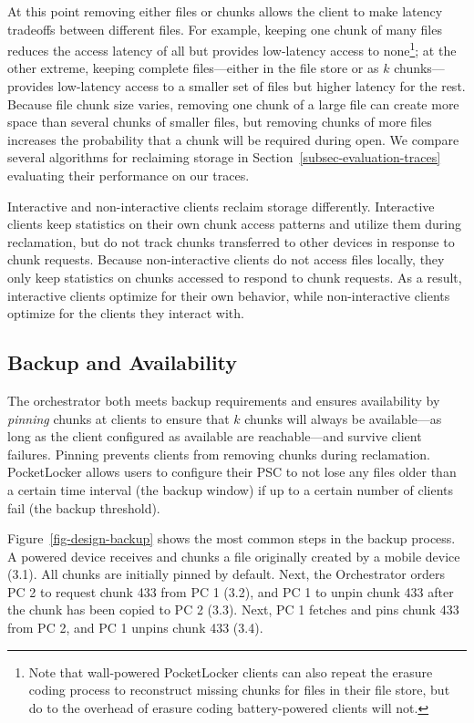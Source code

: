 At this point removing either files or chunks allows the client to make
latency tradeoffs between different files. For example, keeping one chunk of
many files reduces the access latency of all but provides low-latency access
to none\footnote{Note that wall-powered PocketLocker clients can also repeat
the erasure coding process to reconstruct missing chunks for files in their
file store, but do to the overhead of erasure coding battery-powered clients
will not.}; at the other extreme, keeping complete files---either in the file
store or as $k$ chunks---provides low-latency access to a smaller set of
files but higher latency for the rest. Because file chunk size varies,
removing one chunk of a large file can create more space than several chunks
of smaller files, but removing chunks of more files increases the probability
that a chunk will be required during open. We compare several algorithms for
reclaiming storage in Section~\ref{subsec-evaluation-traces} evaluating their
performance on our traces.

Interactive and non-interactive clients reclaim storage differently.
Interactive clients keep statistics on their own chunk access patterns and
utilize them during reclamation, but do not track chunks transferred to other
devices in response to chunk requests. Because non-interactive clients do not
access files locally, they only keep statistics on chunks accessed to respond
to chunk requests. As a result, interactive clients optimize for their own
behavior, while non-interactive clients optimize for the clients they
interact with.

\subsection{Backup and Availability}
\label{subsec-backup}

The orchestrator both meets backup requirements and ensures availability by
\textit{pinning} chunks at clients to ensure that $k$ chunks will always be
available---as long as the client configured as available are reachable---and
survive client failures. Pinning prevents clients from removing chunks during
reclamation. PocketLocker allows users to configure their PSC to not lose any
files older than a certain time interval (the backup window) if up to a
certain number of clients fail (the backup threshold).

Figure~\ref{fig-design-backup} shows the most common steps in the backup
process.  A powered device receives and chunks a file originally created by a
mobile device (3.1).  All chunks are initially pinned by default.  Next, the
Orchestrator orders PC 2 to request chunk 433 from PC 1 (3.2), and PC 1 to
unpin chunk 433 after the chunk has been copied to PC 2 (3.3).  Next, PC 1
fetches and pins chunk 433 from PC 2, and PC 1 unpins chunk 433 (3.4). 

